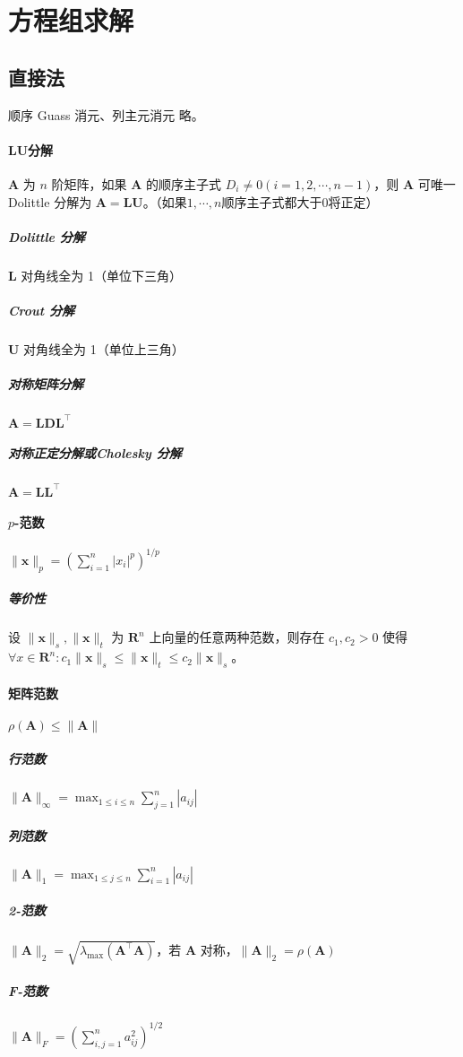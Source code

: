 \documentclass[twocolumn]{ctexart}
\begin{document}


\section{方程组求解}

\subsection{直接法}

顺序 Guass 消元、列主元消元 略。

\paragraph{LU分解} $\mathbf{A}$ 为 $n$ 阶矩阵，如果 $\mathbf{A}$ 的顺序主子式 $D_i\neq 0 (i=1,2,\cdots,n-1)$，则 $\mathbf{A}$ 可唯一 Dolittle 分解为 $\mathbf{A}=\mathbf{L}\mathbf{U}$。（如果$1,\cdots,n$顺序主子式都大于0将正定）

\subparagraph{Dolittle 分解} $\mathbf{L}$ 对角线全为 1（单位下三角）
\subparagraph{Crout 分解} $\mathbf{U}$ 对角线全为 1（单位上三角）
\subparagraph{对称矩阵分解} $\mathbf{A}=\mathbf{L}\mathbf{D}\mathbf{L}^\top$
\subparagraph{对称正定分解或Cholesky 分解} $\mathbf{A}=\mathbf{L}\mathbf{L}^\top$

\paragraph{$p$-范数} $\lVert\mathbf{x}\rVert_p=\left(\sum_{i=1}^n |x_i|^p\right)^{1/p}$
\subparagraph{等价性} 设 $\lVert\mathbf{x}\rVert_s,\lVert\mathbf{x}\rVert_t$ 为 $\mathbf{R}^n$ 上向量的任意两种范数，则存在 $c_1,c_2>0$ 使得 $\forall x\in\mathbf{R}^n: c_1\lVert\mathbf{x}\rVert_s\leq \lVert\mathbf{x}\rVert_t\leq c_2\lVert\mathbf{x}\rVert_s$。
\paragraph{矩阵范数} $\rho(\mathbf{A})\leq \lVert\mathbf{A}\rVert$
\subparagraph{行范数} $\lVert\mathbf{A}\rVert_\infty=\max_{1\leq i\leq n}\sum_{j=1}^n|a_{ij}|$
\subparagraph{列范数} $\lVert\mathbf{A}\rVert_1=\max_{1\leq j\leq n}\sum_{i=1}^n|a_{ij}|$
\subparagraph{2-范数} $\lVert\mathbf{A}\rVert_2=\sqrt{\lambda_{\max}(\mathbf{A}^\top\mathbf{A})}$，若 $\mathbf{A}$ 对称，$\lVert\mathbf{A}\rVert_2=\rho(\mathbf{A})$
\subparagraph{F-范数} $\lVert\mathbf{A}\rVert_F=\left(\sum_{i,j=1}^n a_{ij}^2\right)^{1/2}$
\end{document}

